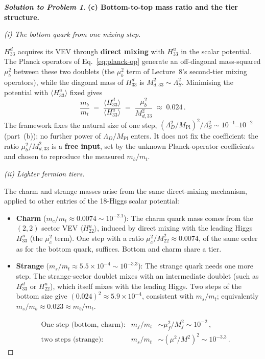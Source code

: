 \documentclass[11pt,a4paper]{article}
\begin{document}
\begin{proof}[\textbf{Solution to Problem 1}]
\bigskip

\textbf{(c) Bottom-to-top mass ratio and the tier structure.}

\textit{(i) The bottom quark from one mixing step.}

$H_{33}^d$ acquires its VEV through \textbf{direct mixing}
with $H_{33}^u$ in the scalar potential.  The Planck operators
of Eq.~\eqref{eq:planck-op} generate an off-diagonal mass-squared
$\mu_b^2$ between these two doublets (the $\mu_b^2$ term of
Lecture~8's second-tier mixing operators), while the diagonal mass of
$H_{33}^d$ is $M_{d,33}^2 \sim \Lambda_S^2$.  Minimising the potential
with $\langle H_{33}^u\rangle$ fixed gives
\[
  \frac{m_b}{m_t}
  \;=\;
  \frac{\langle H_{33}^d \rangle}{\langle H_{33}^u \rangle}
  \;=\; \frac{\mu_b^2}{M_{d,33}^2}
  \;\approx\; 0.024\,.
\]
The framework fixes the natural size of one step,
$(\Lambda_D^2/M_{\text{Pl}})^2/\Lambda_S^2 \sim 10^{-1}$--$10^{-2}$
(part~(b)); no further power of $\Lambda_D/M_{\text{Pl}}$ enters.
It does not fix the coefficient: the ratio $\mu_b^2/M_{d,33}^2$ is a
\textbf{free input}, set by the unknown Planck-operator coefficients
and chosen to reproduce the measured $m_b/m_t$.

\textit{(ii) Lighter fermion tiers.}

The charm and strange masses arise from the same direct-mixing
mechanism, applied to other entries of the 18-Higgs scalar
potential:
\begin{itemize}
  \item \textbf{Charm} ($m_c/m_t \approx 0.0074 \sim 10^{-2.1}$):
    The charm quark mass comes from the $(2,2)$ sector VEV
    $\langle H_{22}^u \rangle$, induced by direct mixing with the
    leading Higgs $H_{33}^u$ (the $\mu_c^2$ term).  One step with a
    ratio $\mu_c^2/M_{22}^2 \approx 0.0074$, of the same order as for
    the bottom quark, suffices.  Bottom and charm share a tier.
  \item \textbf{Strange} ($m_s/m_t \approx 5.5 \times 10^{-4}
    \sim 10^{-3.3}$): The strange quark needs one more step.  The
    strange-sector doublet mixes with an intermediate doublet (such as
    $H_{33}^d$ or $H_{22}^u$), which itself mixes with the leading
    Higgs.  Two steps of the bottom size give
    $(0.024)^2 \approx 5.9 \times 10^{-4}$, consistent with $m_s/m_t$;
    equivalently $m_s/m_b \approx 0.023 \approx m_b/m_t$.
\end{itemize}
\[
  \boxed{\begin{aligned}
  &\text{One step (bottom, charm):} &
  m_f/m_t &\sim \mu_f^2/M_f^2 \sim 10^{-2}\,,\\
  &\text{two steps (strange):} &
  m_s/m_t &\sim (\mu^2/M^2)^2 \sim 10^{-3.3}\,.
  \end{aligned}}
\]


\end{proof}
\end{document}
